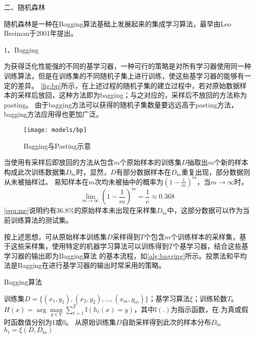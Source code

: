 二、随机森林

随机森林是一种在Bagging算法基础上发展起来的集成学习算法，最早由Leo Breiman于2001年提出\cite{breiman2001}。

1、Bagging

为获得泛化性能强的不同的基学习器，一种可行的策略是对所有学习器使用同一种训练算法，但是在训练集的不同随机子集上进行训练，使这些基学习器的能够有一定的差异。
\autoref{fig:bp}所示，在上述过程的随机子集的建立过程中，若对原始数据样本的采样后放回，这种方法即为bagging；与之对应的，采样后不放回的方法称为pasting\cite{Aurélien2018,Zhou2016}。
由于bagging方法可以获得的随机子集数量要远远高于pasting方法，bagging方法应用得也更加广泛。
\begin{figure}[htbp]
      \centering
      \texttt{[image: models/bp]}
      \caption[Bagging与Pasting示意]{\label{fig:bp}Bagging与Pasting示意\cite{Aurélien2018}}
\end{figure}

当使用有采样后即放回的方法从包含$m$个原始样本的训练集$D$抽取出$m$个新的样本构成此次训练数据集$D_{bs}$时，显然，$D$有部分数据样本在$D_{bs}$重复出现，部分数据则从未被抽样过。
易知样本在$m$次均未被抽中的概率为$(1-\frac{1}{m})^m$，当$m \to \infty$时，
\begin{equation}
      \label{equ:me}
      \lim_{m \to \infty}{(1-\frac{1}{m})}^m = \frac{1}{e} \approx 0.368
\end{equation}
\autoref{equ:me}说明约有36.8\%的原始样本未出现在采样集$D_{bs}$中，这部分数据可以作为当前训练算法的测试集。

按上述思想，可从原始样本训练集$D$采样得到$T$个包含$m$个训练样本的采样集，基于这些采样集，使用特定的机器学习算法可以训练得到$T$个基学习器，结合这些基学习器的输出即为Bagging算法
的基本流程，如\autoref{alg:bagging}所示。投票法和平均法是Bagging在进行基学习器的输出时常采用的策略。
\begin{breakablealgorithm}
      \caption[Bagging算法]{Bagging算法\cite{Zhou2016}}
      \label{alg:bagging}
      \begin{algorithmic}[1] %
            \Require 训练集$D=\{(x_1,y_1),(x_2,y_2),\dots,(x_m,y_m)\}$；基学习算法$\xi$；训练轮数$T$。
            \Ensure $H(x)=\arg \max \limits_{y \in Y} \sum_{t=1}^T \mathbb{I}(h_t(x)=y)$，其中$\mathbb{I}(.)$为指示函数，在$.$为真或假时函数值分别为1或0。
                  \State 从原始训练集$D$自助采样得到此次的样本分布$D_{bs}$
                  \State $h_t=\xi (D,D_{bs})$
            \EndFor
      \end{algorithmic}
\end{breakablealgorithm}

